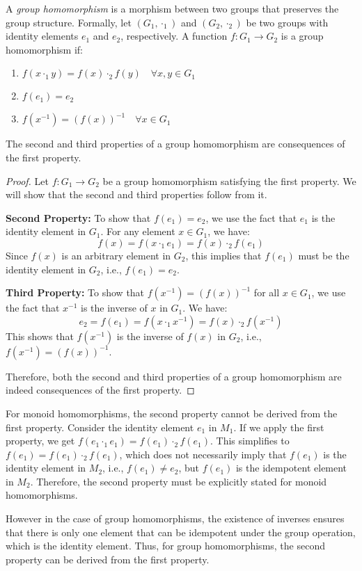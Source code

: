 \documentclass[11pt,fleqn]{book} %
\begin{document}
\begin{definition}
    A \emph{group homomorphism} is a morphism between two groups that preserves the group structure. Formally, let $(G_1, \cdot_1)$ and $(G_2, \cdot_2)$ be two groups with identity elements $e_1$ and $e_2$, respectively. A function $f: G_1 \to G_2$ is a group homomorphism if:
    \begin{enumerate}
        \item $f(x \cdot_1 y) = f(x) \cdot_2 f(y) \quad \forall x, y \in G_1$
        \item $f(e_1) = e_2$
        \item $f(x^{-1}) = (f(x))^{-1} \quad \forall x \in G_1$
    \end{enumerate}
\end{definition}

\begin{proposition}
    The second and third properties of a group homomorphism are consequences of the first property.
\end{proposition}

\begin{proof}
    Let $f: G_1 \to G_2$ be a group homomorphism satisfying the first property. We will show that the second and third properties follow from it.

    \textbf{Second Property:} To show that $f(e_1) = e_2$, we use the fact that $e_1$ is the identity element in $G_1$. For any element $x \in G_1$, we have:
    \[
        f(x) = f(x \cdot_1 e_1) = f(x) \cdot_2 f(e_1)
    \]
    Since $f(x)$ is an arbitrary element in $G_2$, this implies that $f(e_1)$ must be the identity element in $G_2$, i.e., $f(e_1) = e_2$.

    \textbf{Third Property:} To show that $f(x^{-1}) = (f(x))^{-1}$ for all $x \in G_1$, we use the fact that $x^{-1}$ is the inverse of $x$ in $G_1$. We have:
    \[
        e_2 = f(e_1) = f(x \cdot_1 x^{-1}) = f(x) \cdot_2 f(x^{-1})
    \]
    This shows that $f(x^{-1})$ is the inverse of $f(x)$ in $G_2$, i.e., $f(x^{-1}) = (f(x))^{-1}$.

    Therefore, both the second and third properties of a group homomorphism are indeed consequences of the first property.
\end{proof}

\begin{remark}
    For monoid homomorphisms, the second property cannot be derived from the first property. Consider the identity element $e_1$ in $M_1$. If we apply the first property, we get $f(e_1 \cdot_1 e_1) = f(e_1) \cdot_2 f(e_1)$. This simplifies to $f(e_1) = f(e_1) \cdot_2 f(e_1)$, which does not necessarily imply that $f(e_1)$ is the identity element in $M_2$, i.e., $f(e_1) \neq e_2$, but $f(e_1)$ is the idempotent element in $M_2$. Therefore, the second property must be explicitly stated for monoid homomorphisms.

    However in the case of group homomorphisms, the existence of inverses ensures that there is only one element that can be idempotent under the group operation, which is the identity element. Thus, for group homomorphisms, the second property can be derived from the first property.
\end{remark}
\end{document}
